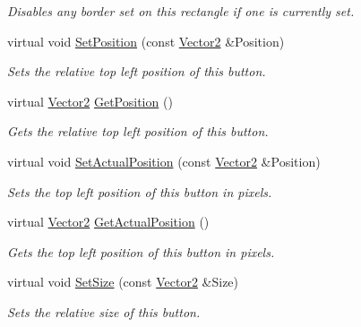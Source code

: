\begin{DoxyCompactItemize}
\begin{DoxyCompactList}\small\item\em Disables any border set on this rectangle if one is currently set. \item\end{DoxyCompactList}\item 
virtual void \hyperlink{classphys_1_1UI_1_1Button_a68e1d9043a614e152c514a959be07d8c}{SetPosition} (const \hyperlink{classphys_1_1Vector2}{Vector2} \&Position)
\begin{DoxyCompactList}\small\item\em Sets the relative top left position of this button. \item\end{DoxyCompactList}\item 
virtual \hyperlink{classphys_1_1Vector2}{Vector2} \hyperlink{classphys_1_1UI_1_1Button_adfa08ace813b88cae114e18f88942642}{GetPosition} ()
\begin{DoxyCompactList}\small\item\em Gets the relative top left position of this button. \item\end{DoxyCompactList}\item 
virtual void \hyperlink{classphys_1_1UI_1_1Button_a50f175a9a9002b3270edc74154d4255b}{SetActualPosition} (const \hyperlink{classphys_1_1Vector2}{Vector2} \&Position)
\begin{DoxyCompactList}\small\item\em Sets the top left position of this button in pixels. \item\end{DoxyCompactList}\item 
virtual \hyperlink{classphys_1_1Vector2}{Vector2} \hyperlink{classphys_1_1UI_1_1Button_a0b991ada87707d8d951dae7c0e3246f6}{GetActualPosition} ()
\begin{DoxyCompactList}\small\item\em Gets the top left position of this button in pixels. \item\end{DoxyCompactList}\item 
virtual void \hyperlink{classphys_1_1UI_1_1Button_a956fe6caf82304cf1332a62b51b6b5de}{SetSize} (const \hyperlink{classphys_1_1Vector2}{Vector2} \&Size)
\begin{DoxyCompactList}\small\item\em Sets the relative size of this button. \item\end{DoxyCompactList}\item 

\end{DoxyCompactItemize}
